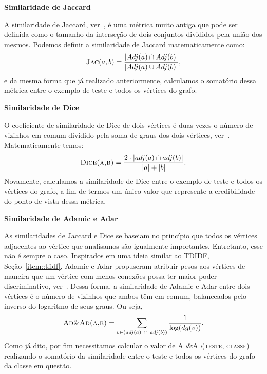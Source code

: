 \begin{description}
\item{\textbf{Similaridade de Jaccard}}
\label{item::jaccard}

A similaridade de Jaccard, ver~\cite{Jaccard01}, é uma métrica muito antiga que pode ser definida como o tamanho da interseção de dois conjuntos divididos pela união dos mesmos. Podemos definir a similaridade de Jaccard matematicamente como:
\begin{equation}
\textsc{Jac}(a, b) =  \frac{|Adj(a) \cap Adj(b)|}{|Adj(a) \cup Adj(b)|},
\end{equation}
e da mesma forma que já realizado anteriormente, calculamos o somatório dessa métrica entre o exemplo de teste e todos os vértices do grafo.


\item{\textbf{Similaridade de Dice}}
\label{item::dice}

O coeficiente de similaridade de Dice de dois vértices é duas vezes o número de vizinhos em comum dividido pela soma de graus dos dois vértices, ver~\cite{Dice45}. Matematicamente temos:
\begin{equation}
\textsc{Dice(a,b)} = \frac{2 \cdot | adj(a) \cap adj(b) | }{| a | + | b |}.
\end{equation}
Novamente, calculamos a similaridade de Dice entre o exemplo de teste e todos os vértices do grafo, a fim de termos um único valor que represente a credibilidade do ponto de vista dessa métrica.

\item{ \textbf{Similaridade de Adamic e Adar}}
\label{item::inverselog}

As similaridades de Jaccard e Dice se baseiam no princípio que todos os vértices adjacentes ao vértice que analisamos são igualmente importantes. Entretanto, esse não é sempre o caso.
Inspirados em uma ideia similar ao TDIDF, Seção~\ref{item::tfidf}, Adamic e Adar propuseram atribuir pesos aos vértices de maneira que um vértice com menos conexões possa ter maior poder discriminativo, ver~\cite{Adamic03}. Dessa forma, a similaridade de Adamic e Adar entre dois vértices é o número de vizinhos que ambos têm em comum, balanceados pelo inverso do logaritmo de seus graus. Ou seja,
\begin{equation}
\textsc{Ad\&Ad(a,b)} =  \sum\limits_{v \in (adj(a)\ \cap\ adj(b))} \frac{1}{ \log(dg(v))}.
\end{equation}
Como já dito, por fim necessitamos calcular o valor de \textsc{Ad\&Ad(teste, classe)} realizando o somatório da similaridade entre o teste e todos os vértices do grafo da classe em questão.

\end{description}



